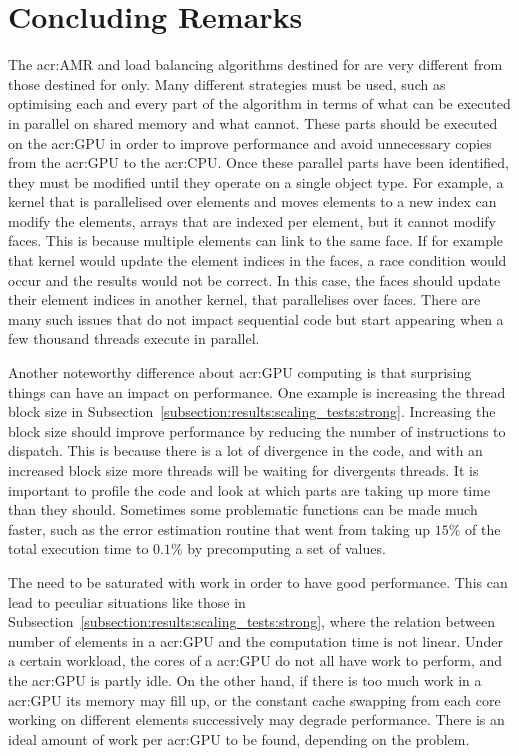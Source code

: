 \section{Concluding Remarks}\label{section:conclusion:remarks}

The \acrshort{acr:AMR} and load balancing algorithms destined for  are very
different from those destined for  only. Many different strategies must be used,
such as optimising each and every part of the algorithm in terms of what can be executed in parallel
on shared memory and what cannot. These parts should be executed on the \acrshort{acr:GPU} in order
to improve performance and avoid unnecessary copies from the \acrshort{acr:GPU} to the
\acrshort{acr:CPU}. Once these parallel parts have been identified, they must be modified until they
operate on a single object type. For example, a kernel that is parallelised over elements and moves
elements to a new index can modify the elements, arrays that are indexed per element, but it cannot
modify faces. This is because multiple elements can link to the same face. If for example that
kernel would update the element indices in the faces, a race condition would occur and the results
would not be correct. In this case, the faces should update their element indices in another kernel,
that parallelises over faces. There are many such issues that do not impact sequential code but
start appearing when a few thousand threads execute in parallel.

Another noteworthy difference about \acrshort{acr:GPU} computing is that surprising things can have
an impact on performance. One example is increasing the thread block size in
Subsection~\ref{subsection:results:scaling_tests:strong}. Increasing the block size should improve
performance by reducing the number of instructions to dispatch. This is because there is a lot of
divergence in the code, and with an increased block size more threads will be waiting for divergents
threads. It is important to profile the code and look at which parts are taking up more time than
they should. Sometimes some problematic functions can be made much faster, such as the error
estimation routine that went from taking up \(15 \% \) of the total execution time to \(0.1 \% \) by
precomputing a set of values.

The  need to be saturated with work in order to have good performance. This can
lead to peculiar situations like those in Subsection~\ref{subsection:results:scaling_tests:strong},
where the relation between number of elements in a \acrshort{acr:GPU} and the computation time is
not linear. Under a certain workload, the cores of a \acrshort{acr:GPU} do not all have work to
perform, and the \acrshort{acr:GPU} is partly idle. On the other hand, if there is too much work in
a \acrshort{acr:GPU} its memory may fill up, or the constant cache swapping from each core working
on different elements successively may degrade performance. There is an ideal amount of work per
\acrshort{acr:GPU} to be found, depending on the problem.

